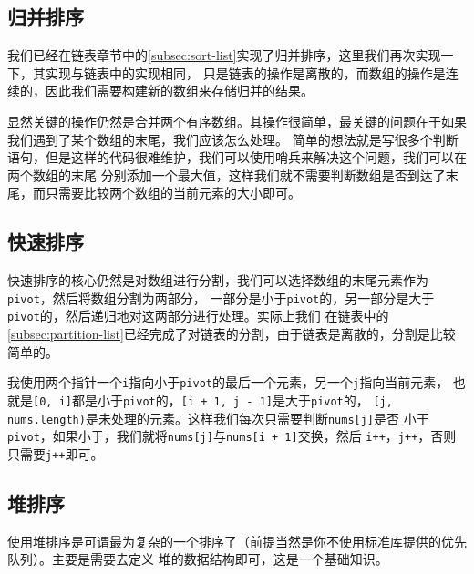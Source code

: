 \documentclass[../../main.tex]{subfiles}
\begin{document}
\subsection{归并排序}

我们已经在链表章节中的\ref{subsec:sort-list}实现了归并排序，这里我们再次实现一下，其实现与链表中的实现相同，
只是链表的操作是离散的，而数组的操作是连续的，因此我们需要构建新的数组来存储归并的结果。

显然关键的操作仍然是合并两个有序数组。其操作很简单，最关键的问题在于如果我们遇到了某个数组的末尾，我们应该怎么处理。
简单的想法就是写很多个判断语句，但是这样的代码很难维护，我们可以使用哨兵来解决这个问题，我们可以在两个数组的末尾
分别添加一个最大值，这样我们就不需要判断数组是否到达了末尾，而只需要比较两个数组的当前元素的大小即可。



\subsection{快速排序}

快速排序的核心仍然是对数组进行分割，我们可以选择数组的末尾元素作为\texttt{pivot}，然后将数组分割为两部分，
一部分是小于\texttt{pivot}的，另一部分是大于\texttt{pivot}的，然后递归地对这两部分进行处理。实际上我们
在链表中的\ref{subsec:partition-list}已经完成了对链表的分割，由于链表是离散的，分割是比较简单的。

我使用两个指针一个\texttt{i}指向小于\texttt{pivot}的最后一个元素，另一个\texttt{j}指向当前元素，
也就是\texttt{[0, i]}都是小于\texttt{pivot}的，\texttt{[i + 1, j - 1]}是大于\texttt{pivot}的，
\texttt{[j, nums.length)}是未处理的元素。这样我们每次只需要判断\texttt{nums[j]}是否
小于\texttt{pivot}，如果小于，我们就将\texttt{nums[j]}与\texttt{nums[i + 1]}交换，然后
\texttt{i++}，\texttt{j++}，否则只需要\texttt{j++}即可。



\subsection{堆排序}

使用堆排序是可谓最为复杂的一个排序了（前提当然是你不使用标准库提供的优先队列）。主要是需要去定义
堆的数据结构即可，这是一个基础知识。
\end{document}
